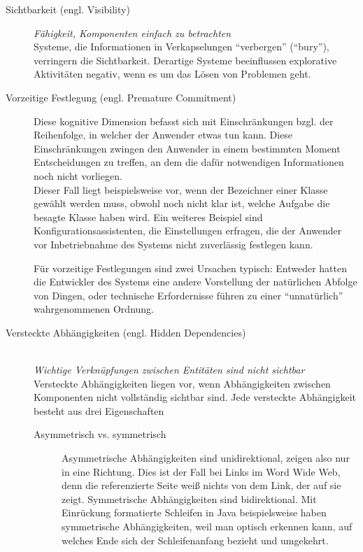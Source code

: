 \begin{important}
\begin{description}
\begin{description}
        \item[Sichtbarkeit (engl. Visibility)] \textit{Fähigkeit, Komponenten einfach zu betrachten}\\
        Systeme, die Informationen in Verkapselungen ``verbergen'' (``bury''), verringern die Sichtbarkeit. Derartige Systeme beeinflussen explorative Aktivitäten negativ, wenn es um das Lösen von Problemen geht.
        
        \item[Vorzeitige Festlegung (engl. Premature Commitment)]
        Diese kognitive Dimension befasst sich mit Einschränkungen bzgl. der Reihenfolge,
        in welcher der Anwender etwas tun kann. Diese Einschränkungen zwingen den Anwender in einem bestimmten Moment Entscheidungen zu treffen, an dem die dafür notwendigen Informationen noch nicht vorliegen.
        \\
        Dieser Fall liegt beispielsweise vor, wenn der Bezeichner einer Klasse gewählt werden muss,
        obwohl noch nicht klar ist, welche Aufgabe die besagte Klasse haben wird. Ein weiteres Beispiel sind
        Konfigurationsassistenten, die Einstellungen erfragen, die der Anwender vor Inbetriebnahme des Systems
        nicht zuverlässig festlegen kann.
        
        Für vorzeitige Festlegungen sind zwei Ursachen typisch: Entweder hatten die Entwickler
        des Systems eine andere Vorstellung der natürlichen Abfolge von Dingen, oder technische Erfordernisse
        führen zu einer ``unnatürlich'' wahrgenommenen Ordnung.
        
        \item[Versteckte Abhängigkeiten (engl. Hidden Dependencies)] \hfill \\ \textit{Wichtige Verknüpfungen zwischen Entitäten sind nicht sichtbar}\\
        Versteckte Abhängigkeiten liegen vor, wenn Abhängigkeiten zwischen Komponenten nicht vollständig sichtbar sind.
        Jede versteckte Abhängigkeit besteht aus drei Eigenschaften
        \begin{description}
        
            \item[Asymmetrisch vs. symmetrisch]
            Asymmetrische Abhängigkeiten sind unidirektional, zeigen also nur in eine Richtung.
            Dies ist der Fall bei Links im Word Wide Web, denn die referenzierte Seite weiß nichts von
            dem Link, der auf sie zeigt. Symmetrische Abhängigkeiten sind bidirektional.
            Mit Einrückung formatierte Schleifen in Java beispielsweise haben symmetrische
            Abhängigkeiten, weil man optisch erkennen kann, auf welches Ende sich der
            Schleifenanfang bezieht und umgekehrt. 
            

\end{description}
\end{description}
\end{description}
\end{important}
